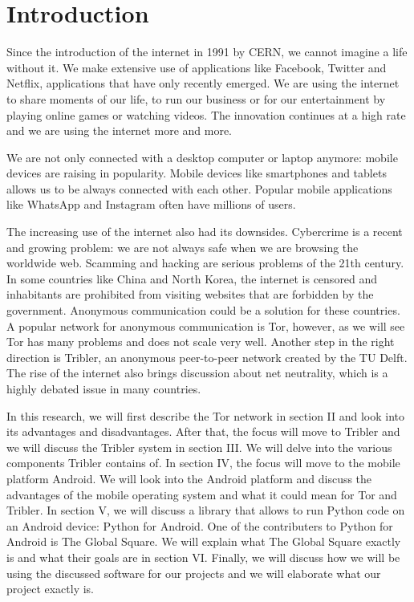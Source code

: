 \section{Introduction}
	Since the introduction of the internet in 1991 by CERN, we cannot imagine a life without it. We make extensive use of applications like Facebook, Twitter and Netflix, applications that have only recently emerged. We are using the internet to share moments of our life, to run our business or for our entertainment by playing online games or watching videos. The innovation continues at a high rate and we are using the internet more and more.
	
	We are not only connected with a desktop computer or laptop anymore: mobile devices are raising in popularity. Mobile devices like smartphones and tablets allows us to be always connected with each other. Popular mobile applications like WhatsApp and Instagram often have millions of users.
	
	The increasing use of the internet also had its downsides. Cybercrime is a recent and growing problem: we are not always safe when we are browsing the worldwide web. Scamming and hacking are serious problems of the 21th century. In some countries like China and North Korea, the internet is censored and inhabitants are prohibited from visiting websites that are forbidden by the government. Anonymous communication could be a solution for these countries. A popular network for anonymous communication is Tor, however, as we will see Tor has many problems and does not scale very well. Another step in the right direction is Tribler, an anonymous peer-to-peer network created by the TU Delft. The rise of the internet also brings discussion about net neutrality, which is a highly debated issue in many countries.
	
	In this research, we will first describe the Tor network in section II and look into its advantages and disadvantages. After that, the focus will move to Tribler and we will discuss the Tribler system in section III. We will delve into the various components Tribler contains of. In section IV, the focus will move to the mobile platform Android. We will look into the Android platform and discuss the advantages of the mobile operating system and what it could mean for Tor and Tribler. In section V, we will discuss a library that allows to run Python code on an Android device: Python for Android. One of the contributers to Python for Android is The Global Square. We will explain what The Global Square exactly is and what their goals are in section VI. Finally, we will discuss how we will be using the discussed software for our projects and we will elaborate what our project exactly is.